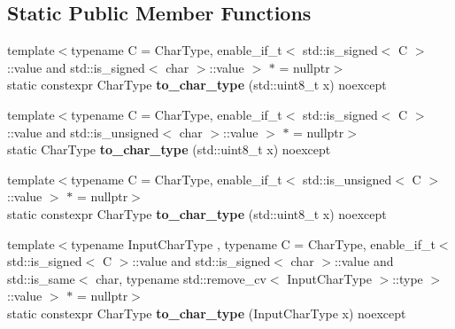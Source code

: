 \subsection*{Static Public Member Functions}
\begin{DoxyCompactItemize}
\item 
\mbox{\label{classnlohmann_1_1detail_1_1binary__writer_ab77aa48692bd4e64e4f051ce6aeb6d2d}} 
{\footnotesize template$<$typename C  = Char\+Type, enable\+\_\+if\+\_\+t$<$ std\+::is\+\_\+signed$<$ C $>$\+::value and std\+::is\+\_\+signed$<$ char $>$\+::value $>$ $\ast$  = nullptr$>$ }\\static constexpr Char\+Type {\bfseries to\+\_\+char\+\_\+type} (std\+::uint8\+\_\+t x) noexcept
\item 
\mbox{\label{classnlohmann_1_1detail_1_1binary__writer_a5e46f0dd3550901b15cf85265808d1ec}} 
{\footnotesize template$<$typename C  = Char\+Type, enable\+\_\+if\+\_\+t$<$ std\+::is\+\_\+signed$<$ C $>$\+::value and std\+::is\+\_\+unsigned$<$ char $>$\+::value $>$ $\ast$  = nullptr$>$ }\\static Char\+Type {\bfseries to\+\_\+char\+\_\+type} (std\+::uint8\+\_\+t x) noexcept
\item 
\mbox{\label{classnlohmann_1_1detail_1_1binary__writer_ab77aa48692bd4e64e4f051ce6aeb6d2d}} 
{\footnotesize template$<$typename C  = Char\+Type, enable\+\_\+if\+\_\+t$<$ std\+::is\+\_\+unsigned$<$ C $>$\+::value $>$ $\ast$  = nullptr$>$ }\\static constexpr Char\+Type {\bfseries to\+\_\+char\+\_\+type} (std\+::uint8\+\_\+t x) noexcept
\item 
\mbox{\label{classnlohmann_1_1detail_1_1binary__writer_a2c2b2132ce56b3b45593374b622baa67}} 
{\footnotesize template$<$typename Input\+Char\+Type , typename C  = Char\+Type, enable\+\_\+if\+\_\+t$<$ std\+::is\+\_\+signed$<$ C $>$\+::value and std\+::is\+\_\+signed$<$ char $>$\+::value and std\+::is\+\_\+same$<$ char, typename std\+::remove\+\_\+cv$<$ Input\+Char\+Type $>$\+::type $>$\+::value $>$ $\ast$  = nullptr$>$ }\\static constexpr Char\+Type {\bfseries to\+\_\+char\+\_\+type} (Input\+Char\+Type x) noexcept
\end{DoxyCompactItemize}


